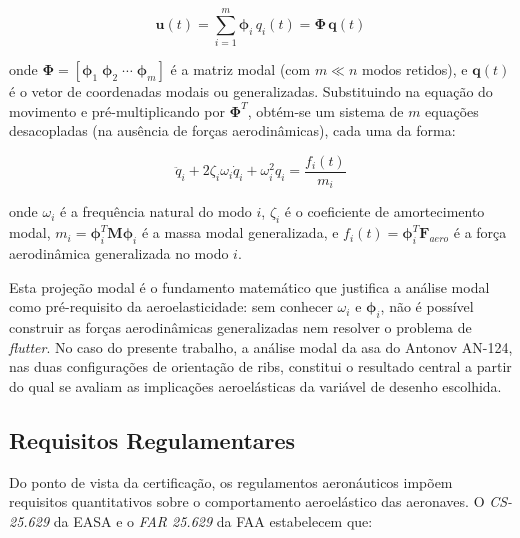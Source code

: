\documentclass[11pt,twoside,a4paper]{report}
\begin{document}
\begin{equation}
    \mathbf{u}(t) = \sum_{i=1}^{m} \boldsymbol{\phi}_i \, q_i(t) = 
    \boldsymbol{\Phi} \, \mathbf{q}(t)
    \label{eq:modal_transform}
\end{equation}

\noindent onde $\boldsymbol{\Phi} = [\boldsymbol{\phi}_1 \; 
\boldsymbol{\phi}_2 \; \cdots \; \boldsymbol{\phi}_m]$ é a matriz modal (com $m \ll n$ modos retidos), e $\mathbf{q}(t)$ é o vetor de coordenadas modais ou generalizadas. Substituindo na equação do movimento e pré-multiplicando por $\boldsymbol{\Phi}^T$, obtém-se um sistema de $m$ equações desacopladas (na ausência de forças aerodinâmicas), cada uma da forma:

\begin{equation}
    \ddot{q}_i + 2\zeta_i \omega_i \dot{q}_i + \omega_i^2 q_i = 
    \frac{f_i(t)}{m_i}
    \label{eq:modal_eq}
\end{equation}

\noindent onde $\omega_i$ é a frequência natural do modo $i$, $\zeta_i$ é o coeficiente de amortecimento modal, $m_i = \boldsymbol{\phi}_i^T \mathbf{M} \boldsymbol{\phi}_i$ é a massa modal generalizada, e $f_i(t) = \boldsymbol{\phi}_i^T \mathbf{F}_{aero}$ é a força aerodinâmica generalizada no modo $i$.

Esta projeção modal é o fundamento matemático que justifica a análise modal como pré-requisito da aeroelasticidade: sem conhecer $\omega_i$ e $\boldsymbol{\phi}_i$, não é possível construir as forças aerodinâmicas generalizadas nem resolver o problema de \textit{flutter}. No caso do presente trabalho, a análise modal da asa do Antonov AN-124, nas duas configurações de orientação de ribs, constitui o resultado central a partir do qual se avaliam as implicações aeroelásticas da variável de desenho escolhida.

\subsection{Requisitos Regulamentares}

Do ponto de vista da certificação, os regulamentos aeronáuticos impõem requisitos quantitativos sobre o comportamento aeroelástico das aeronaves. O \textit{CS-25.629} da EASA \cite{EASA2022} e o \textit{FAR 25.629} da FAA \cite{FAA2023} estabelecem que:
\end{document}
